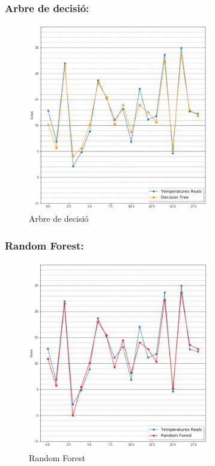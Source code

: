 \documentclass[10pt,a4paper,twocolumn,twoside]{article}
\begin{document}
\subsubsection{Arbre de decisió:}
\begin{figure}[!h]
\centering
	\includegraphics[width=80mm]{../img/decisionTreePredict}
	\caption{Arbre de decisió}
	\label{fig-DT}
\end{figure}
\subsubsection{Random Forest:}
\begin{figure}[!h]
\centering
	\includegraphics[width=80mm]{../img/randomForestPredict}
	\caption{Random Forest}
	\label{fig-RF}
\end{figure}
\newpage
\end{document}
